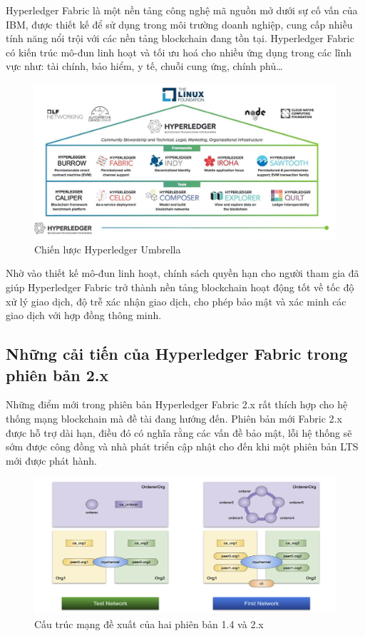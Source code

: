 Hyperledger Fabric là một nền tảng công nghệ mã nguồn mở dưới sự cố vấn của IBM, được thiết kế để sử dụng trong môi trường doanh nghiệp, cung cấp nhiều tính năng nổi trội với các nền tảng blockchain đang tồn tại. Hyperledger Fabric có kiến trúc mô-đun linh hoạt và tối ưu hoá cho nhiều ứng dụng trong các lĩnh vực như: tài chính, bảo hiểm, y tế, chuỗi cung ứng, chính phủ\ldots{} 
\begin{figure}[htbp]
\centering
\includegraphics[width=.9\linewidth]{img/hlf_um.jpg}
\caption{Chiến lược Hyperledger Umbrella}
\end{figure}

Nhờ vào thiết kế mô-đun linh hoạt, chính sách quyền hạn cho người tham gia đã giúp Hyperledger Fabric trở thành nền tảng blockchain hoạt động tốt về tốc độ xử lý giao dịch, độ trễ xác nhận giao dịch, cho phép bảo mật và xác minh các giao dịch với hợp đồng thông minh.

\subsection{Những cải tiến của Hyperledger Fabric trong phiên bản 2.x}

Những điểm mới trong phiên bản Hyperledger Fabric 2.x rất thích hợp cho hệ thống mạng blockchain mà đề tài đang hướng đến. Phiên bản mới Fabric 2.x được hỗ trợ dài hạn, điều đó có nghĩa rằng các vấn đề bảo mật, lỗi hệ thống sẽ sớm được công đồng và nhà phát triển cập nhật cho đến khi một phiên bản LTS mới được phát hành.

\begin{figure}[htbp]
\centering
\includegraphics[width=.9\linewidth]{img/hlf_network.png}
\caption{Cấu trúc mạng đề xuất của hai phiên bản 1.4 và 2.x}
\end{figure}

